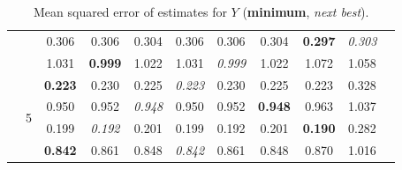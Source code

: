 \documentclass[authoryear, review, 11pt]{elsarticle}
\begin{document}
\begin{table}
\begin{center}
{\begin{tabular}{ccccccccccc}
  & & 0.306 & 0.306 & 0.304 & 0.306 & 0.306 & 0.304 & \textbf{0.297} & \emph{0.303} \\ 
  & & 1.031 & \textbf{0.999} & 1.022 & 1.031 & \emph{0.999} & 1.022 & 1.072 & 1.058 \\
  \cline{3-10}
  & \multirow{4}{*}{5} & \textbf{0.223} & 0.230 & 0.225 & \emph{0.223} & 0.230 & 0.225 & 0.223 & 0.328 \\ 
  & & 0.950 & 0.952 & \emph{0.948} & 0.950 & 0.952 & \textbf{0.948} & 0.963 & 1.037 \\ 
  & & 0.199 & \emph{0.192} & 0.201 & 0.199 & 0.192 & 0.201 & \textbf{0.190} & 0.282 \\ 
  & & \textbf{0.842} & 0.861 & 0.848 & \emph{0.842} & 0.861 & 0.848 & 0.870 & 1.016 \\
  \end{tabular}}
\caption{Mean squared error of estimates for $Y$ (\textbf{minimum}, \emph{next best}).\label{table:MSEY}}
\end{center}
\end{table}

	
\end{document}
